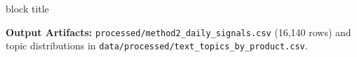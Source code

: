 \documentclass[aspectratio=169, 10pt]{beamer}
\newenvironment{highlightcard}[1][]{%
        \begin{beamercolorbox}[rounded=true,shadow=false,wd=\linewidth,sep=3.5pt,#1]{block title}%
        \fontsize{7.8pt}{9.8pt}\selectfont%
    }{%
        \end{beamercolorbox}%
    }
\begin{document}
\begin{frame}[t]
        \vspace{0.15cm}                                                                                                                                                                                
        \begin{highlightcard}                                                                                                                                                                          
            \centering\scriptsize                                                                                                                                                                      
            \textbf{Output Artifacts:} \texttt{processed/method2\_daily\_signals.csv} (16,140 rows) and topic distributions in \texttt{data/processed/text\_topics\_by\_product.csv}.                  
        \end{highlightcard}                                                                                                                                                                            
    \end{frame}                                                                                                                                                                                        
                                                                                                                                                                                                       
\end{document}
